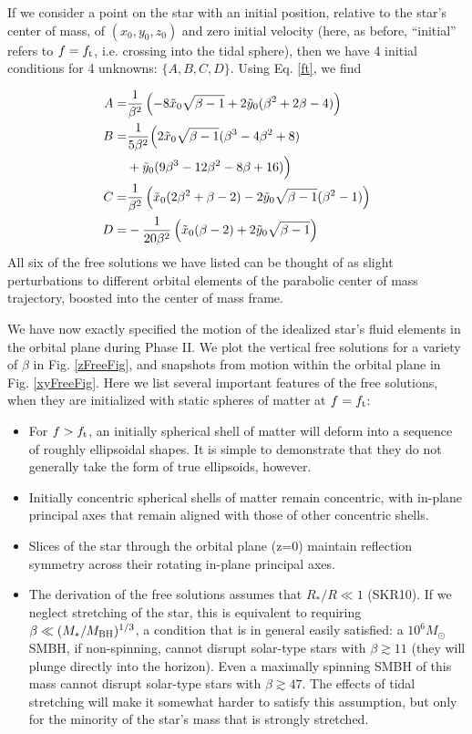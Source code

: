 \documentclass[useAMS, twocolumn, usenatbib]{mn2e}
\begin{document}
If we consider a point on the star with an initial position, relative to the star's center of mass, of $(x_0, y_0, z_0)$ and zero initial velocity (here, as before, ``initial'' refers to $f=f_{\rm t}$, i.e. crossing into the tidal sphere), then we have 4 initial conditions for 4 unknowns: $\{A, B, C, D\}$.  Using Eq. \ref{ft}, we find

\begin{align}\label{xyICs}
A=&\frac{1}{\beta^2} \left(-8 \tilde{x}_0 \sqrt{\beta -1} + 2\tilde{y}_0 (\beta^2+2\beta -4)\right) \\ 
B=&\frac{1}{5\beta^2} \Big(2 \tilde{x}_0 \sqrt{\beta -1} (\beta^3-4\beta^2+8) \\
&+ \tilde{y}_0 (9\beta^3-12\beta^2-8\beta+16)\Big) \notag \\
C=&\frac{1}{\beta^2} \left(\tilde{x}_0 (2\beta^2+\beta-2) - 2 \tilde{y}_0 \sqrt{\beta-1} (\beta^2 -1)\right) \\
D=&-\frac{1}{20\beta^2} \left(\tilde{x}_0 (\beta - 2) + 2 \tilde{y}_0 \sqrt{\beta -1}\right)
\end{align}
All six of the free solutions we have listed can be thought of as slight perturbations to different orbital elements of the parabolic center of mass trajectory, boosted into the center of mass frame.

We have now exactly specified the motion of the idealized star's fluid elements in the orbital plane during Phase II.  We plot the vertical free solutions for a variety of $\beta$ in Fig. \ref{zFreeFig}, and snapshots from motion within the orbital plane in Fig. \ref{xyFreeFig}.  Here we list several important features of the free solutions, when they are initialized with static spheres of matter at $f=f_{\rm t}$:
\begin{itemize}
\item For $f>f_{\rm t}$, an initially spherical shell of matter will deform into a sequence of roughly ellipsoidal shapes.  It is simple to demonstrate that they do not generally take the form of true ellipsoids, however.
\item Initially concentric spherical shells of matter remain concentric, with in-plane principal axes that remain aligned with those of other concentric shells.
\item Slices of the star through the orbital plane (z=0) maintain reflection symmetry across their rotating in-plane principal axes.
\item The derivation of the free solutions assumes that $R_*/R \ll 1$ (SKR10).  If we neglect stretching of the star, this is equivalent to requiring $\beta \ll (M_*/M_{\rm BH})^{1/3}$, a condition that is in general easily satisfied: a $10^6 M_{\odot}$ SMBH, if non-spinning, cannot disrupt solar-type stars with $\beta \gtrsim 11$ (they will plunge directly into the horizon).  Even a maximally spinning SMBH of this mass cannot disrupt solar-type stars with $\beta \gtrsim 47$.  The effects of tidal stretching will make it somewhat harder to satisfy this assumption, but only for the minority of the star's mass that is strongly stretched.
\end{itemize}
\end{document}
